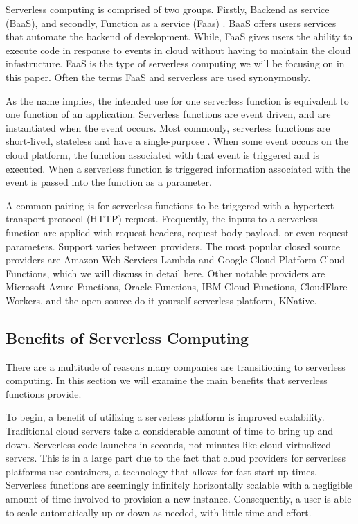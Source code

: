 \documentclass[10pt, conference]{IEEEtran}
\begin{document}
Serverless computing is comprised of two groups. Firstly, Backend as service (BaaS), and secondly, Function as a service (Faas) \cite{b1}. BaaS offers users services that automate the backend of development. While, FaaS gives users the ability to execute code in response to events in cloud without having to maintain the cloud infastructure. FaaS is the type of serverless computing we will be focusing on in this paper. Often the terms FaaS and serverless are used synonymously. 

As the name implies, the intended use for one serverless function is equivalent to one function of an application. Serverless functions are event driven, and are instantiated when the event occurs. Most commonly, serverless functions are short-lived, stateless and have a single-purpose \cite{b2}. When some event occurs on the cloud platform, the function associated with that event is triggered and is executed. When a serverless function is triggered information associated with the event is passed into the function as a parameter. 

A common pairing is for serverless functions to be triggered with a hypertext transport protocol (HTTP) request. Frequently, the inputs to a serverless function are applied with request headers, request body payload, or even request parameters. Support varies between providers. The most popular closed source providers are Amazon Web Services Lambda and Google Cloud Platform Cloud Functions, which we will discuss in detail here. Other notable providers are Microsoft Azure Functions, Oracle Functions, IBM Cloud Functions, CloudFlare Workers, and the open source do-it-yourself serverless platform, KNative.


\subsection{Benefits of Serverless Computing}
There are a multitude of reasons many companies are transitioning to serverless computing. In this section we will examine the main benefits that serverless functions provide. 

To begin, a benefit of utilizing a serverless platform is improved scalability. Traditional cloud servers take a considerable amount of time to bring up and down. Serverless code launches in seconds, not minutes like cloud virtualized servers. This is in a large part due to the fact that cloud providers for serverless platforms use containers, a technology that allows for fast start-up times. Serverless functions are seemingly infinitely horizontally scalable with a negligible amount of time involved to provision a new instance. Consequently, a user is able to scale automatically up or down as needed, with little time and effort. 
\end{document}
